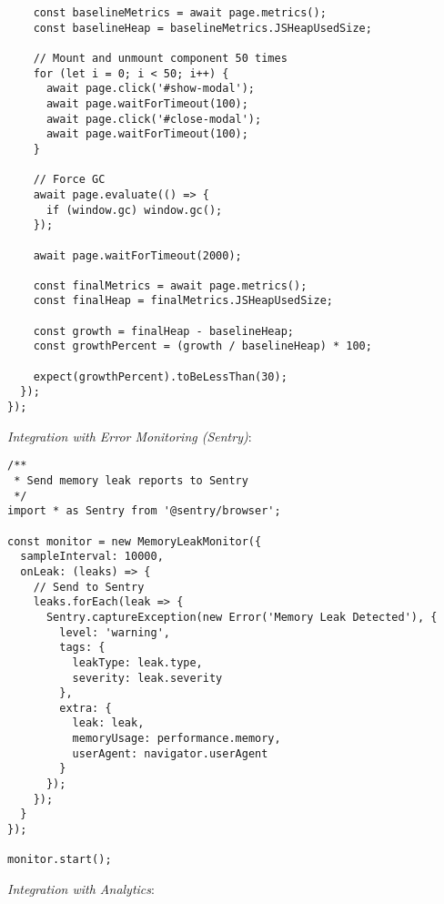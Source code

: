 \documentclass[11pt]{article}
\begin{document}
\begin{verbatim}
    const baselineMetrics = await page.metrics();
    const baselineHeap = baselineMetrics.JSHeapUsedSize;
    
    // Mount and unmount component 50 times
    for (let i = 0; i < 50; i++) {
      await page.click('#show-modal');
      await page.waitForTimeout(100);
      await page.click('#close-modal');
      await page.waitForTimeout(100);
    }
    
    // Force GC
    await page.evaluate(() => {
      if (window.gc) window.gc();
    });
    
    await page.waitForTimeout(2000);
    
    const finalMetrics = await page.metrics();
    const finalHeap = finalMetrics.JSHeapUsedSize;
    
    const growth = finalHeap - baselineHeap;
    const growthPercent = (growth / baselineHeap) * 100;
    
    expect(growthPercent).toBeLessThan(30);
  });
});
\end{verbatim}

\emph{Integration with Error Monitoring (Sentry)}:

\begin{verbatim}
/**
 * Send memory leak reports to Sentry
 */
import * as Sentry from '@sentry/browser';

const monitor = new MemoryLeakMonitor({
  sampleInterval: 10000,
  onLeak: (leaks) => {
    // Send to Sentry
    leaks.forEach(leak => {
      Sentry.captureException(new Error('Memory Leak Detected'), {
        level: 'warning',
        tags: {
          leakType: leak.type,
          severity: leak.severity
        },
        extra: {
          leak: leak,
          memoryUsage: performance.memory,
          userAgent: navigator.userAgent
        }
      });
    });
  }
});

monitor.start();
\end{verbatim}

\emph{Integration with Analytics}:
\end{document}
